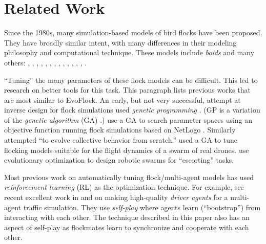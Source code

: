 \documentclass[letterpaper]{article}
\begin{document}
\section{Related Work}
\label{sec:related}

Since the 1980s, many simulation-based models of bird flocks have been proposed. They have broadly similar intent, with many differences in their modeling philosophy and computational technique. These models include \textit{boids} and many others:
\citet{aoki_simulation_1982}, 
\citet{akira_okubo_dynamical_1986}, 
\citet{reynolds_flocks_1987},
\citet{heppner_stochastic_1990}, 
\citet{tu_artificial_1994},
\citet{vicsek_novel_1995},
\citet{toner_flocks_1998}, 
\citet{couzin_collective_2002},
\citet{bajec_simulating_2005},
\citet{cucker_emergent_2007},
\citet{moskon_fuzzy_2007},
\citet{cavagna_seventh_2008},
\citet{bajec_organized_2009},
\citet{bhattacharya_collective_2010}
\citet{vasarhelyi_optimized_2018}
\citet{hoetzlein_flock2_2024}.

``Tuning'' the many parameters of these flock models can be difficult. This led to research on better tools for this task. This paragraph lists previous works that are most similar to EvoFlock. An early, but not very successful, attempt at inverse design for flock simulations \citep{reynolds_evolved_1993} used \textit{genetic programming} \citep{koza_genetic_1992}. (GP is a variation of the \textit{genetic algorithm} (GA) \citep{holland_adaptation_1975}.) \citet{stonedahl_finding_2011} use a GA to search parameter spaces using an objective function running flock simulations based on NetLogo \citep{tisue_netlogo_2004}. Similarly \citet{demsar_evolution_2017} attempted ``to evolve collective behavior from scratch.'' \citet{vasarhelyi_optimized_2018} used a GA to tune flocking models suitable for the flight dynamics of a swarm of real drones. \citet{stolfi_escorting_2025} use evolutionary optimization to design robotic swarms for ``escorting'' tasks.

Most previous work on automatically tuning flock/multi-agent models has used \textit{reinforcement learning} (RL) \citep{sutton_reinforcement_1998} as the optimization technique. For example, see recent excellent work in \citet{cornelisse_building_2025} and \citet{cusumano-towner_robust_2025} on making high-quality \textit{driver agents} for a multi-agent traffic simulation. They use \textit{self-play} where agents learn (``bootstrap'') from interacting with each other. The technique described in this paper also has an aspect of self-play as flockmates learn to synchronize and cooperate with each other.
\end{document}

